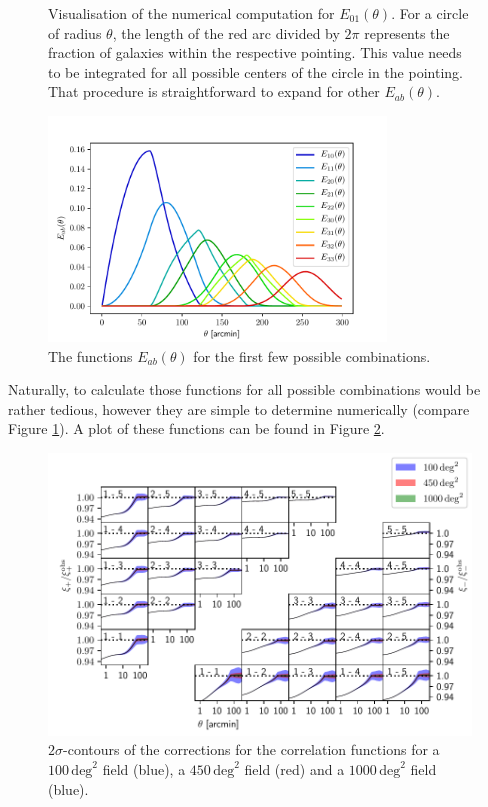 \documentclass[referee]{aa} %
\renewcommand{\[}{\begin{equation}}
\renewcommand{\]}{\end{equation}}
\renewcommand{\rm}{\mathrm}
\begin{document}
\begin{appendix}
\begin{figure}
\centering
\def\svgwidth{120pt}

\caption[Visualisation of the numerical computation for $E_{01}(\theta)$.]{Visualisation of the numerical computation for $E_{01}(\theta)$. For a circle of radius $\theta$, the length of the red arc divided by $2\pi$ represents the fraction of galaxies within the respective pointing. This value needs to be integrated for all possible centers of the circle in the pointing. That procedure is straightforward to expand for other $E_{ab}(\theta)$.}
\label{fig:eoftheta_sim}
\end{figure}

\begin{figure}
\centering
\includegraphics[width = 0.8\textwidth]{images/eab.pdf}
\caption{The functions $E_{ab}(\theta)$ for the first few possible combinations.}
\label{fig:eab}
\end{figure}
Naturally, to calculate those functions for all possible combinations would be rather tedious, however they are simple to determine numerically (compare Figure \ref{fig:eoftheta_sim}). A plot of these functions can be found in Figure \ref{fig:eab}.

\begin{figure}
\centering
\includegraphics[width=\textwidth]{images/finite_footprint.pdf}
\caption{$2\sigma$-contours of the corrections for the correlation functions for a $100\,\rm{deg}^2$ field (blue), a $450\,\rm{deg}^2$ field (red) and a $1000\,\rm{deg}^2$ field (blue).}
\label{fig:finite_footprint}
\end{figure}


\end{appendix}
\end{document}
